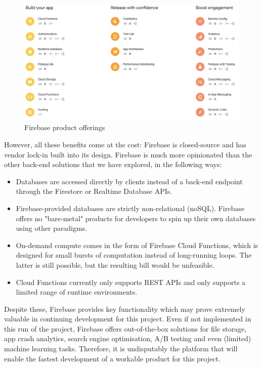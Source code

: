\begin{figure}[h]
    \begin{center}
        \includegraphics[scale=0.3]{images/firebase_offerings.png}
    \end{center}
    \caption{Firebase product offerings}
    \label{firebase_compute_offerings}
\end{figure}

However, all these benefits come at the cost: Firebase is closed-source and has vendor lock-in built into its design. Firebase is much more opinionated than the other back-end solutions that we have explored, in the following ways:

\begin{itemize}
    \item Databases are accessed directly by clients instead of a back-end endpoint through the Firestore or Realtime Database APIs. 
    \item Firebase-provided databases are strictly non-relational (noSQL). Firebase offers no "bare-metal" products for developers to spin up their own databases using other paradigms.
    \item On-demand compute comes in the form of Firebase Cloud Functions, which is designed for small bursts of computation instead of long-running loops. The latter is still possible, but the resulting bill would be unfeasible.
    \item Cloud Functions currently only supports REST APIs and only supports a limited range of runtime environments.
\end{itemize}

Despite these, Firebase provides key functionality which may prove extremely valuable in continuing development for this project. Even if not implemented in this run of the project, Firebase offers out-of-the-box solutions for file storage, app crash analytics, search engine optimisation, A/B testing and even (limited) machine learning tasks. Therefore, it is undisputably the platform that will enable the fastest development of a workable product for this project.

